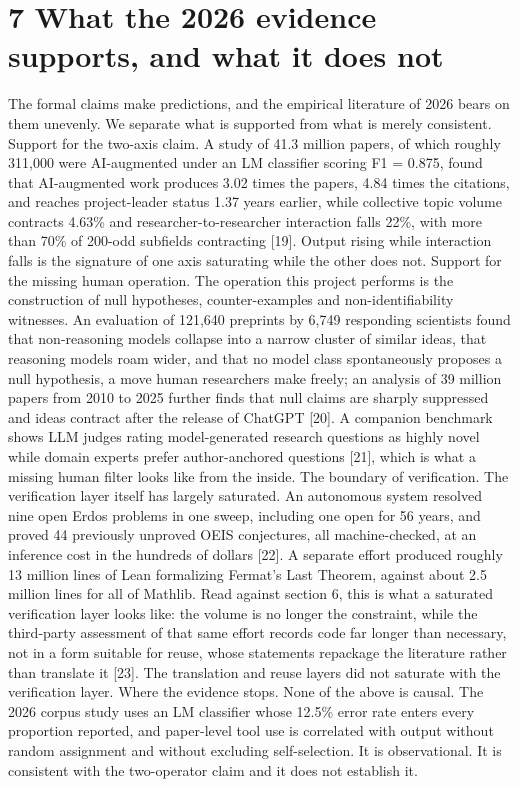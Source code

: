 \documentclass[11pt,a4paper]{article}
\theoremstyle{definition}
\theoremstyle{remark}
\begin{document}
\section*{7  What the 2026 evidence supports, and what it does not}
The formal claims make predictions, and the empirical literature of 2026 bears on them unevenly. We separate what is supported from what is merely consistent.
Support for the two-axis claim. A study of 41.3 million papers, of which roughly 311,000 were AI-augmented under an LM classifier scoring F1 = 0.875, found that AI-augmented work produces 3.02 times the papers, 4.84 times the citations, and reaches project-leader status 1.37 years earlier, while collective topic volume contracts 4.63\% and researcher-to-researcher interaction falls 22\%, with more than 70\% of 200-odd subfields contracting [19]. Output rising while interaction falls is the signature of one axis saturating while the other does not.
Support for the missing human operation. The operation this project performs is the construction of null hypotheses, counter-examples and non-identifiability witnesses. An evaluation of 121,640 preprints by 6,749 responding scientists found that non-reasoning models collapse into a narrow cluster of similar ideas, that reasoning models roam wider, and that no model class spontaneously proposes a null hypothesis, a move human researchers make freely; an analysis of 39 million papers from 2010 to 2025 further finds that null claims are sharply suppressed and ideas contract after the release of ChatGPT [20]. A companion benchmark shows LLM judges rating model-generated research questions as highly novel while domain experts prefer author-anchored questions [21], which is what a missing human filter looks like from the inside.
The boundary of verification. The verification layer itself has largely saturated. An autonomous system resolved nine open Erdos problems in one sweep, including one open for 56 years, and proved 44 previously unproved OEIS conjectures, all machine-checked, at an inference cost in the hundreds of dollars [22]. A separate effort produced roughly 13 million lines of Lean formalizing Fermat's Last Theorem, against about 2.5 million lines for all of Mathlib. Read against section 6, this is what a saturated verification layer looks like: the volume is no longer the constraint, while the third-party assessment of that same effort records code far longer than necessary, not in a form suitable for reuse, whose statements repackage the literature rather than translate it [23]. The translation and reuse layers did not saturate with the verification layer.
Where the evidence stops. None of the above is causal. The 2026 corpus study uses an LM classifier whose 12.5\% error rate enters every proportion reported, and paper-level tool use is correlated with output without random assignment and without excluding self-selection. It is observational. It is consistent with the two-operator claim and it does not establish it.
\end{document}
